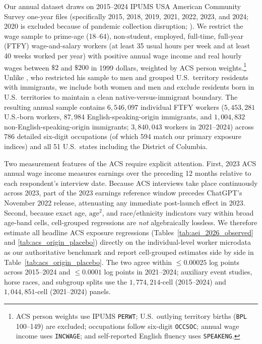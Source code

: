 \documentclass[11pt]{amsart}
\begin{document}
Our annual dataset draws on 2015--2024 IPUMS USA American Community Survey one-year files (specifically 2015, 2018, 2019, 2021, 2022, 2023, and 2024; 2020 is excluded because of pandemic collection disruption; \citealp{Ruggles2026}). We restrict the wage sample to prime-age (18--64), non-student, employed, full-time, full-year (FTFY) wage-and-salary workers (at least 35 usual hours per week and at least 40 weeks worked per year) with positive annual wage income and real hourly wages between $\$2$ and $\$200$ in 1999 dollars, weighted by ACS person weights.\footnote{ACS person weights use IPUMS \texttt{PERWT}; U.S.\ outlying territory births (\texttt{BPL} 100--149) are excluded; occupations follow six-digit \texttt{OCCSOC}; annual wage income uses \texttt{INCWAGE}; and self-reported English fluency uses \texttt{SPEAKENG}.} Unlike \citet{Song2017}, who restricted his sample to men and grouped U.S.\ territory residents with immigrants, we include both women and men and exclude residents born in U.S.\ territories to maintain a clean native-versus-immigrant boundary. The resulting annual sample contains $6{,}546{,}097$ individual FTFY workers ($5{,}453{,}281$ U.S.-born workers, $87{,}984$ English-speaking-origin immigrants, and $1{,}004{,}832$ non-English-speaking-origin immigrants; $3{,}840{,}043$ workers in 2021--2024) across 786 detailed six-digit occupations (of which 594 match our primary exposure indices) and all 51 U.S.\ states including the District of Columbia.

Two measurement features of the ACS require explicit attention. First, 2023 ACS annual wage income measures earnings over the preceding 12 months relative to each respondent's interview date. Because ACS interviews take place continuously across 2023, part of the 2023 earnings reference window precedes ChatGPT's November 2022 release, attenuating any immediate post-launch effect in 2023. Second, because exact age, $\text{age}^2$, and race/ethnicity indicators vary within broad age-band cells, cell-grouped regressions are \emph{not} algebraically lossless. We therefore estimate all headline ACS exposure regressions (Tables~\ref{tab:aei_2026_observed} and \ref{tab:acs_origin_placebo}) directly on the individual-level worker microdata as our authoritative benchmark and report cell-grouped estimates side by side in Table~\ref{tab:acs_origin_placebo}. The two agree within $\le 0.00025$ log points across 2015--2024 and $\le 0.0001$ log points in 2021--2024; auxiliary event studies, horse races, and subgroup splits use the $1{,}774{,}214$-cell (2015--2024) and $1{,}044{,}851$-cell (2021--2024) panels.
\end{document}
